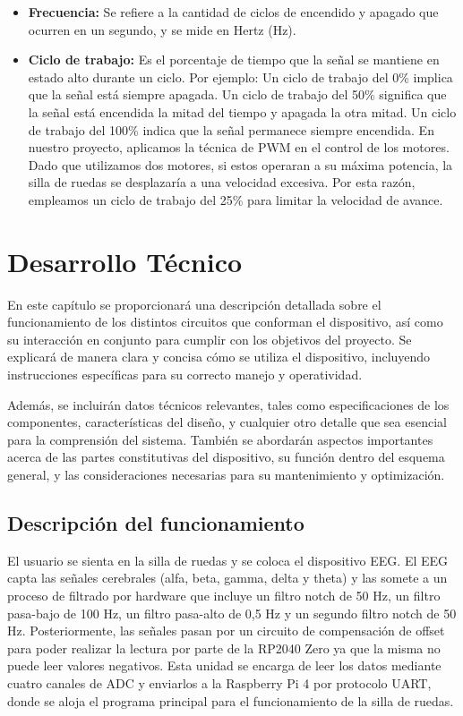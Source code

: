 \documentclass{article}
\begin{document}
\begin{itemize}
    \item \textbf{Frecuencia:} Se refiere a la cantidad de ciclos de encendido y apagado que ocurren en un segundo, y se mide en Hertz (Hz).
    \item \textbf{Ciclo de trabajo:} Es el porcentaje de tiempo que la señal se mantiene en estado alto durante un ciclo. Por ejemplo:
    Un ciclo de trabajo del 0\% implica que la señal está siempre apagada.
    Un ciclo de trabajo del 50\% significa que la señal está encendida la mitad del tiempo y apagada la otra mitad.
    Un ciclo de trabajo del 100\% indica que la señal permanece siempre encendida.
    En nuestro proyecto, aplicamos la técnica de PWM en el control de los motores. Dado que utilizamos dos motores, si estos operaran a su máxima potencia, la silla de ruedas se desplazaría a una velocidad excesiva. Por esta razón, empleamos un ciclo de trabajo del 25\% para limitar la velocidad de avance.
\end{itemize}

\section{Desarrollo Técnico}
En este capítulo se proporcionará una descripción detallada sobre el funcionamiento de los distintos circuitos que conforman el dispositivo, así como su interacción en conjunto para cumplir con los objetivos del proyecto. Se explicará de manera clara y concisa cómo se utiliza el dispositivo, incluyendo instrucciones específicas para su correcto manejo y operatividad.

Además, se incluirán datos técnicos relevantes, tales como especificaciones de los componentes, características del diseño, y cualquier otro detalle que sea esencial para la comprensión del sistema. También se abordarán aspectos importantes acerca de las partes constitutivas del dispositivo, su función dentro del esquema general, y las consideraciones necesarias para su mantenimiento y optimización.

\subsection{Descripción del funcionamiento}
El usuario se sienta en la silla de ruedas y se coloca el dispositivo EEG. El EEG capta las señales cerebrales (alfa, beta, gamma, delta y theta) y las somete a un proceso de filtrado por hardware que incluye un filtro notch de 50 Hz, un filtro pasa-bajo de 100 Hz, un filtro pasa-alto de 0,5 Hz y un segundo filtro notch de 50 Hz. Posteriormente, las señales pasan por un circuito de compensación de offset para poder realizar la lectura por parte de la RP2040 Zero ya que la misma no puede leer valores negativos. Esta unidad se encarga de leer los datos mediante cuatro canales de ADC y enviarlos a la Raspberry Pi 4 por protocolo UART, donde se aloja el programa principal para el funcionamiento de la silla de ruedas.
\end{document}
